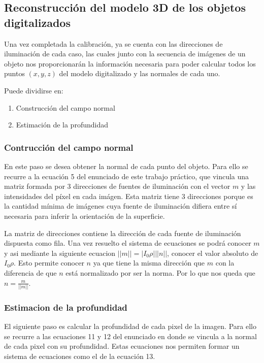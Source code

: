 \subsection{Reconstrucción del modelo 3D de los objetos digitalizados}

Una vez completada la calibración, ya se cuenta con las direcciones de
iluminación de cada caso, las cuales junto con la secuencia de imágenes de un
objeto nos proporcionarán la información necesaria para poder calcular todos
los puntos $(x,y,z)$ del modelo digitalizado y las normales de cada uno.

Puede dividirse en:

\begin{enumerate}
\item Construcción del campo normal
\item Estimación de la profundidad
\end{enumerate}

\subsubsection{Contrucción del campo normal}

En este paso se desea obtener la normal de cada punto del objeto. Para ello
se recurre a la ecuación 5 del enunciado de este trabajo práctico, que
vincula una matriz formada por 3 direcciones de fuentes de iluminación con el
vector $m$ y las intensidades del píxel en cada imágen. Esta matriz tiene 3
direcciones porque es la cantidad mínima de imágenes cuya fuente de
iluminación difiera entre sí necesaria para inferir la orientación de la
superficie.

La matriz de direcciones contiene la dirección de cada fuente de iluminación
dispuesta como fila. Una vez resuelto el sistema de ecuaciones se podrá conocer $m$ y asi mediante la siguiente ecuacion $||m|| = |I_0\rho| ||n||$, conocer el valor absoluto de $I_0\rho$. Esto permite conocer $n$ ya que tiene la misma dirección que $m$ con la diferencia de que $n$ está normalizado por ser la norma. Por lo que nos queda que $n = \frac{m}{||m||}$.

\subsubsection{Estimacion de la profundidad}

El siguiente paso es calcular la profundidad de cada pixel de la imagen. Para ello se recurre a las ecuaciones 11 y 12 del enunciado en donde se vincula a la normal de cada pixel con su profundidad. Estas ecuaciones nos permiten formar un sistema de ecuaciones como el de la ecuación 13.

